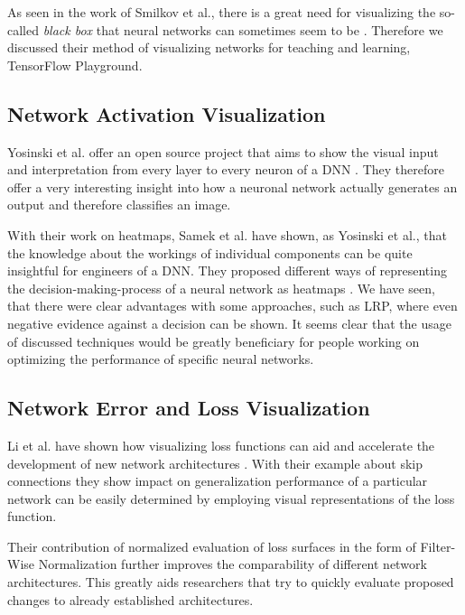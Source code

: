 \documentclass{acmsiggraph}               %
\begin{document}
As seen in the work of Smilkov et al., there is a great need for visualizing the so-called \textit{black box} that neural networks can sometimes seem to be \cite{Smilkov2017}. Therefore we discussed their method of visualizing networks for teaching and learning, TensorFlow Playground.

\subsection{Network Activation Visualization}

Yosinski et al. offer an open source project that aims to show the visual input and interpretation from every layer to every neuron of a DNN \cite{Yosinski2015}. They therefore offer a very interesting insight into how a neuronal network actually generates an output and therefore classifies an image.

With their work on heatmaps, Samek et al. have shown, as Yosinski et al., that the knowledge about the workings of individual components can be quite insightful for engineers of a DNN. They proposed different ways of representing the decision-making-process of a neural network as heatmaps \cite{Samek2017}. We have seen, that there were clear advantages with some approaches, such as LRP, where even negative evidence against a decision can be shown. It seems clear that the usage of discussed techniques would be greatly beneficiary for people working on optimizing the performance of specific neural networks.

\subsection{Network Error and Loss Visualization}

Li et al. have shown how visualizing loss functions can aid and accelerate the development of new network architectures \cite{Li2017}.
With their example about skip connections \cite{He2015} they show impact on generalization performance of a particular network can be easily determined by employing visual representations of the loss function.

Their contribution of normalized evaluation of loss surfaces in the form of Filter-Wise Normalization further improves the comparability of different network architectures. This greatly aids researchers that try to quickly evaluate proposed changes to already established architectures.
\end{document}
